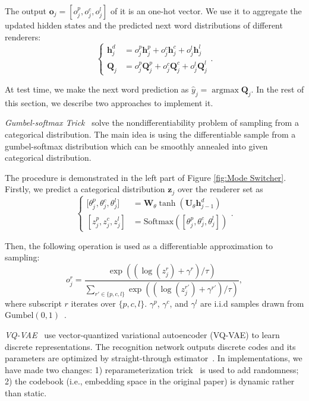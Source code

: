 \documentclass[letterpaper]{article} %
\begin{document}
	The output $\mathbf{o}_j = [o_j^p, o_j^c, o_j^l]$ of it is an one-hot vector. We use it to aggregate the updated hidden states and the predicted next word distributions of different renderers:
	\begin{equation}
	\label{equ:Equation 11}
	\left\{\begin{aligned}
	\mathbf{h}^d_j & = o_j^p\mathbf{h}_j^p + o_j^c\mathbf{h}_j^c + o_j^l\mathbf{h}_j^l \\
	\mathbf{Q}_j & = o_j^p\mathbf{Q}_j^p + o_j^c\mathbf{Q}_j^c + o_j^l\mathbf{Q}_j^l
	\end{aligned}\right..
	\end{equation}

	At test time, we make the next word prediction as $\hat{y}_j = \mathop{\arg\max} \mathbf{Q}_j$.  In the rest of this section, we describe two approaches to implement it.

	\textit{Gumbel-softmax Trick}~\citep{jang2016categorical} solve the nondifferentiability problem of sampling from a categorical distribution. The main idea is using the differentiable sample from a gumbel-softmax distribution which can be smoothly annealed into given categorical distribution.

	The procedure is demonstrated in the left part of Figure \ref{fig:Mode Switcher}. Firstly, we predict a categorical distribution $\mathbf{z}_j$ over the renderer set as
	\begin{equation}
	\label{equ: Equation 12}
	\left\{\begin{aligned}
	\mathrm{[} \theta_j^p, \theta_j^c, \theta_j^l ] & = \mathbf{W}_\theta\tanh(\mathbf{U}_\theta\mathbf{h}^d_{j-1}) \\
	[ z_j^p, z_j^c, z_j^l ] & = \mathrm{Softmax}([ \theta_j^p, \theta_j^c, \theta_j^l ])
	\end{aligned}\right..
	\end{equation}

	Then, the following operation is used as a differentiable approximation to sampling:
	\begin{equation}
	o_j^r = \frac{\exp((\log(z_j^r) + \gamma^r) / \tau)}{\sum_{r' \in \{p, c, l\}} \exp((\log(z_j^{r'}) + \gamma^{r'}) / \tau)},
	\end{equation}
	where subscript $r$ iterates over $\{p, c, l\}$. $\gamma^p$, $\gamma^c$, and $\gamma^l$ are i.i.d  samples drawn from $\mathrm{Gumbel}(0, 1)$~\citep{gumbel1948statistical}.

	\textit{VQ-VAE}~\citep{van2017neural} use vector-quantized variational autoencoder (VQ-VAE) to learn discrete representations. The recognition network outputs discrete codes and its parameters are optimized by straight-through estimator~\citep{bengio2013estimating}. In implementations, we have made two changes: 1) reparameterization trick~\citep{kingma2013auto} is used to add randomness; 2) the codebook (i.e., embedding space in the original paper) is dynamic rather than static.
\end{document}
